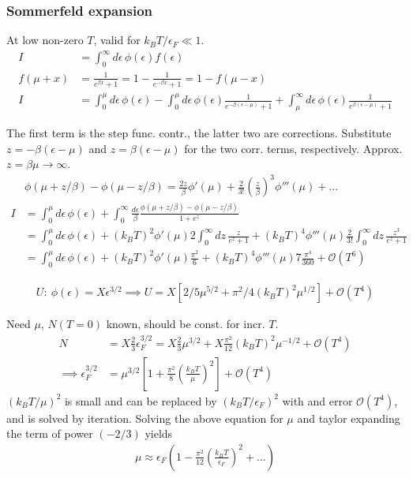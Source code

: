 \documentclass[a4paper, english, 12pt]{article}
\newcommand{\eps}{\epsilon}
\newcommand{\closed}[1]{\left( #1 \right)}
\newcommand{\bracket}[1]{\left[ #1 \right]}
\begin{document}
\begin{multicols*}{2}
\subsubsection*{\scriptsize Sommerfeld expansion}
At low non-zero $T$, valid for $k_B T/\eps_F\ll1$. 
\begin{align*}
    I &= \int_0^\infty d\eps\, \phi(\eps) f(\eps) \\    
    f(\mu+x) &= \frac{1}{e^{\beta x}+1} = 1 - \frac{1}{e^{-\beta x}+1} = 1-f(\mu-x) \\
    I &=\int_0^\mu d\eps\, \phi(\eps) - \int_0^\mu d\eps\, \phi(\eps)\frac{1}{e^{-\beta(\eps-\mu)} +1 } + \int_\mu^\infty d\eps\, \phi(\eps) \frac{1}{e^{\beta(\eps-\mu)} +1}
\end{align*}

The first term is the step func. contr., the latter two are corrections. Substitute $z=-\beta(\eps-\mu)$ and $z=\beta(\eps-\mu)$ for the two corr. terms, respectively. Approx. $z=\beta\mu\to\infty$.  
\begin{align*}
    &\phi(\mu+z/\beta) - \phi(\mu-z/\beta) = \frac{2z}{\beta}\phi'(\mu) + \frac{2}{3!}\closed{\frac{z}{\beta}}^3 \phi'''(\mu)+... \\
    I&=\int_0^\mu d\eps\, \phi(\eps) + \int_0^\infty \frac{d\eps}{\beta} \frac{\phi(\mu+z/\beta) - \phi(\mu-z/\beta)}{1+e^z} \\
     &= \int_0^\mu d\eps\, \phi(\eps) + (k_B T)^2 \phi'(\mu) 2 \int_{0}^\infty dz\, \frac{z}{e^z+1} + (k_B T)^4 \phi'''(\mu) \frac{2}{3!} \int_0^\infty dz\, \frac{z^3}{e^z+1} \\ 
    &= \int_0^\mu d\eps\, \phi(\eps) + (k_B T)^2 \phi'(\mu) \frac{\pi^2}{6} + (k_B T)^4 \phi'''(\mu) 7 \frac{\pi^4}{360} + \mathcal{O}(T^6)
\end{align*} 


\begin{align*}
    U:\:\phi(\eps)=X\eps^{3/2}\implies U=X[2/5 \mu^{5/2} + \pi^2/4 (k_B T)^2 \mu^{1/2}] + \mathcal{O}(T^4)
\end{align*}

Need $\mu$, $N(T=0)$ known, should be const. for incr. $T$. 
\begin{align*}
    N &= X \frac{2}{3}\eps_F^{3/2} = X \frac{2}{3}\mu^{3/2} + X\frac{\pi^2}{12} (k_B T)^{2} \mu^{-1/2} + \mathcal{O}(T^4) \\ 
    \implies \eps_F^{3/2} &= \mu^{3/2}\bracket{1+\frac{\pi^2}{8}\closed{\frac{k_B T}{\mu}}^2 } + \mathcal{O}(T^4)
\end{align*}
$(k_B T/\mu)^2$ is small and can be replaced by $(k_B T/\eps_F)^2$ with and error $\mathcal{O}(T^4)$, and is solved by iteration. Solving the above equation for $\mu$ and taylor expanding the term of power $(-2/3)$ yields 
\begin{align*}
    \mu \approx \eps_F \closed{1 - \frac{\pi^2}{12} \closed{\frac{k_B T}{\eps_F}}^2+...}
\end{align*}


\end{multicols*}
\end{document}
